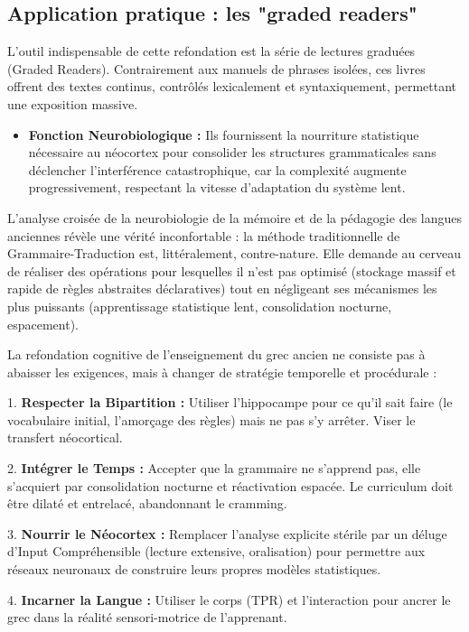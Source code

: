 \subsection{Application pratique : les "graded readers"}

L'outil indispensable de cette refondation est la série de lectures graduées (Graded Readers).
Contrairement aux manuels de phrases isolées, ces livres offrent des textes continus, contrôlés
lexicalement et syntaxiquement, permettant une exposition massive.

\begin{itemize}\item \textbf{Fonction Neurobiologique :} Ils fournissent la \og nourriture\fg{} statistique nécessaire au néocortex pour consolider les structures grammaticales sans déclencher l'interférence catastrophique, car la complexité augmente progressivement, respectant la vitesse d'adaptation du système lent.\cite{III-3-1-ref53}\end{itemize}L'analyse croisée de la neurobiologie de la mémoire et de la pédagogie des langues anciennes révèle
une vérité inconfortable : la méthode traditionnelle de Grammaire-Traduction est, littéralement, \og
contre-nature\fg{}. Elle demande au cerveau de réaliser des opérations pour lesquelles il n'est pas
optimisé (stockage massif et rapide de règles abstraites déclaratives) tout en négligeant ses
mécanismes les plus puissants (apprentissage statistique lent, consolidation nocturne, espacement).

La refondation cognitive de l'enseignement du grec ancien ne consiste pas à abaisser les exigences,
mais à changer de stratégie temporelle et procédurale :

1. \textbf{Respecter la Bipartition :} Utiliser l'hippocampe pour ce qu'il sait faire (le
vocabulaire initial, l'amorçage des règles) mais ne pas s'y arrêter. Viser le transfert néocortical.

2. \textbf{Intégrer le Temps :} Accepter que la grammaire ne s'apprend pas, elle s'acquiert par
consolidation nocturne et réactivation espacée. Le curriculum doit être dilaté et entrelacé,
abandonnant le \og cramming\fg{}.

3. \textbf{Nourrir le Néocortex :} Remplacer l'analyse explicite stérile par un déluge d'Input
Compréhensible (lecture extensive, oralisation) pour permettre aux réseaux neuronaux de construire
leurs propres modèles statistiques.

4. \textbf{Incarner la Langue :} Utiliser le corps (TPR) et l'interaction pour ancrer le grec dans
la réalité sensori-motrice de l'apprenant.

